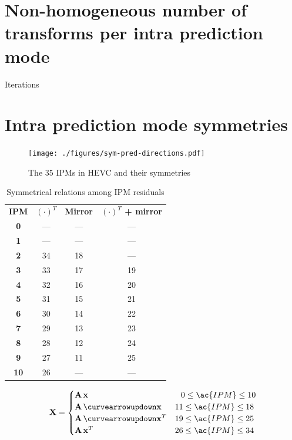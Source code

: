 \documentclass[11pt,a4paper,openright,twoside]{book}
\numberwithin{equation}{section} %
\numberwithin{figure}{section} %
\numberwithin{table}{section} %
\begin{document}
\section{Non-homogeneous number of transforms per intra prediction mode}
\label{sec:non_homogeneous_number_of_transforms_per_intra_prediction_mode}

Iterations

\section{Intra prediction mode symmetries}
\label{sec:intra_prediction_mode_symmetries}

\begin{figure}[t]
	\centering
	\texttt{[image: ./figures/sym-pred-directions.pdf]}
	\caption{The 35 \acsp{IPM} in \acs{HEVC} and their symmetries}
	\label{fig:sym_pred_directions}
\end{figure}

\begin{table}[tb]
	\centering
	\def\arraystretch{0.75}
	\begin{tabular}{c c c c}
	\bf IPM     & ${(\cdot)}^T$ & \bf Mirror & \bf ${(\cdot)}^T$ + mirror\\[1ex]
	\bf 0       & ---           & ---    & ---    \\
	\bf 1       & ---           & ---    & ---    \\
	\bf 2       & 34            & 18     & ---    \\
	\bf 3       & 33            & 17     & 19     \\
	\bf 4       & 32            & 16     & 20     \\
	\bf 5       & 31            & 15     & 21     \\
	\bf 6       & 30            & 14     & 22     \\
	\bf 7       & 29            & 13     & 23     \\
	\bf 8       & 28            & 12     & 24     \\
	\bf 9       & 27            & 11     & 25     \\
	\bf 10      & 26            & ---    & ---    \\
	\end{tabular}
	\caption{Symmetrical relations among \ac{IPM} residuals}
	\label{tab:relations_ipm_residuals}
\end{table}

\begin{equation}
	\X =
	\begin{cases}
		\A \, \x & \;\;\, 0 \le \ac{IPM} \le 10 \\
		\A \, \curvearrowupdown\x & 11 \le \ac{IPM} \le 18 \\
		\A \, \curvearrowupdown\x^T & 19 \le \ac{IPM} \le 25 \\
		\A \, \x^T & 26 \le \ac{IPM} \le 34 \\
	\end{cases}
\end{equation}
\end{document}
